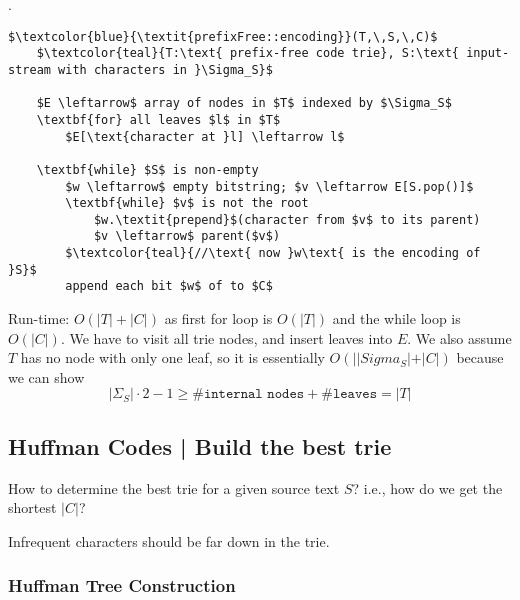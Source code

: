 \documentclass{article}
\begin{document}
\begin{codes}.
    \begin{lstlisting}[style=cppstyle, mathescape=true]
    $\textcolor{blue}{\textit{prefixFree::encoding}}(T,\,S,\,C)$
    $\textcolor{teal}{T:\text{ prefix-free code trie}, S:\text{ input-stream with characters in }\Sigma_S}$
    
    $E \leftarrow$ array of nodes in $T$ indexed by $\Sigma_S$
    \textbf{for} all leaves $l$ in $T$
        $E[\text{character at }l] \leftarrow l$
    
    \textbf{while} $S$ is non-empty
        $w \leftarrow$ empty bitstring; $v \leftarrow E[S.pop()]$
        \textbf{while} $v$ is not the root
            $w.\textit{prepend}$(character from $v$ to its parent)
            $v \leftarrow$ parent($v$)
        $\textcolor{teal}{//\text{ now }w\text{ is the encoding of }S}$
        append each bit $w$ of to $C$
    \end{lstlisting}
    Run-time: $O(|T| + |C|)$ as first for loop is $O(|T|)$ and the while loop is $O(|C|)$. We have to visit all trie nodes, and insert leaves into $E$. We also assume $T$ has no node with only one leaf, so it is essentially $O(||Sigma_S| + |C|)$ because we can show 
    \[ |\Sigma_S| \cdot 2 - 1 \geq \#\texttt{internal nodes} + \#\texttt{leaves} = |T| \]
\end{codes}

\subsection{Huffman Codes | Build the best trie} 

\begin{Question}{}
    How to determine the best trie for a given source text $S$? i.e., how do we get the shortest $|C|$?  
\end{Question}

\begin{solution}
    Infrequent characters should be far down in the trie. 
\end{solution}

\subsubsection{Huffman Tree Construction} 
\end{document}
